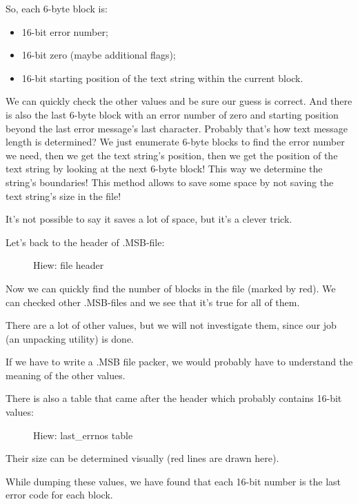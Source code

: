 So, each 6-byte block is:

\begin{itemize}
\item 16-bit error number; 
\item 16-bit zero (maybe additional flags); 
\item 16-bit starting position of 
the text string within the current block.
\end{itemize}

We can quickly check the other values and be sure our guess is correct.
And there is also the last  6-byte block 
with an error number of zero and starting position beyond the last error message's last character.
Probably that's how text message length is 
determined?
We just enumerate 6-byte blocks to find the error number
we need, then we get the text string's position, then we get the position of the text string by looking at the next
6-byte block!
This way we determine the string's boundaries!
This method allows to 
save some space by not saving the text string's size in the file!

It's not possible to say it saves a lot of space, but it's a clever trick.

\clearpage
Let's back to the header of .MSB-file:

\begin{figure}[H]
\centering
{}
\caption{Hiew: file header}
\label{fig:oracle_MSB_3}
\end{figure}

Now we can quickly find the number of blocks in the file (marked by red).
We can checked other .MSB-files and we see that it's true for all of them.

There are a lot of other values, but we will not investigate them, since our job (an unpacking utility) is done.

If we have to write a .MSB file packer, we would probably have to understand the meaning of the other values.

\clearpage
There is also a table that came after the header which probably contains 16-bit values:

\begin{figure}[H]
\centering
{}
\caption{Hiew: last\_errnos table}
\label{fig:oracle_MSB_4}
\end{figure}

Their size can be determined visually (red lines are drawn here).

While dumping these values, we have found that each 16-bit number is the last error code for each block.

